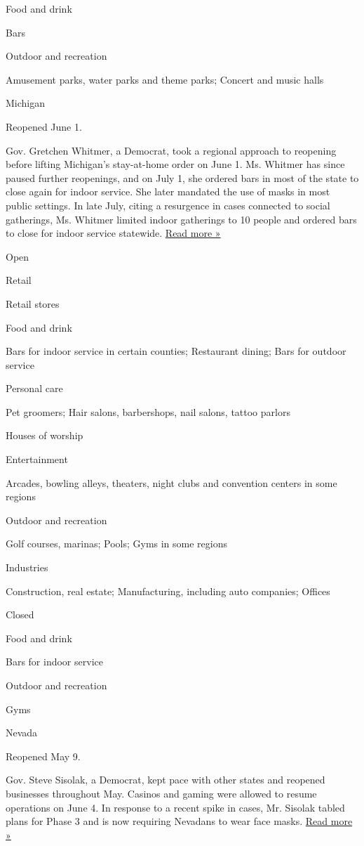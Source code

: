 Food and drink

Bars

Outdoor and recreation

Amusement parks, water parks and theme parks; Concert and music halls

Michigan

Reopened June 1.

Gov. Gretchen Whitmer, a Democrat, took a regional approach to reopening
before lifting Michigan's stay-at-home order on June 1. Ms. Whitmer has
since paused further reopenings, and on July 1, she ordered bars in most
of the state to close again for indoor service. She later mandated the
use of masks in most public settings. In late July, citing a resurgence
in cases connected to social gatherings, Ms. Whitmer limited indoor
gatherings to 10 people and ordered bars to close for indoor service
statewide.
\href{https://www.freep.com/story/news/local/michigan/2020/07/29/detroit-casinos-reopening-michigan-restrictions/5537945002/}{Read
more »}

Open

Retail

Retail stores

Food and drink

Bars for indoor service in certain counties; Restaurant dining; Bars for
outdoor service

Personal care

Pet groomers; Hair salons, barbershops, nail salons, tattoo parlors

Houses of worship

Entertainment

Arcades, bowling alleys, theaters, night clubs and convention centers in
some regions

Outdoor and recreation

Golf courses, marinas; Pools; Gyms in some regions

Industries

Construction, real estate; Manufacturing, including auto companies;
Offices

Closed

Food and drink

Bars for indoor service

Outdoor and recreation

Gyms

Nevada

Reopened May 9.

Gov. Steve Sisolak, a Democrat, kept pace with other states and reopened
businesses throughout May. Casinos and gaming were allowed to resume
operations on June 4. In response to a recent spike in cases, Mr.
Sisolak tabled plans for Phase 3 and is now requiring Nevadans to wear
face masks.
\href{https://www.rgj.com/story/news/2020/07/27/sisolak-announcement-live-covid-nevada-coronavirus-update/5523115002/}{Read
more »}

